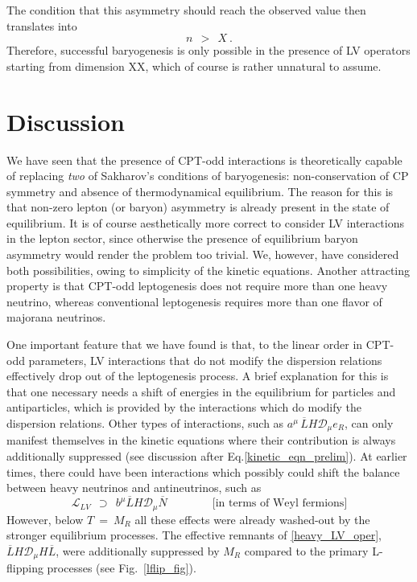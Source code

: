 \documentclass[12pt]{revtex4}
\newcommand{\md}{\mathcal{D}}
\newcommand{\ov}{\overline}
\begin{document}
	The condition that this asymmetry should reach the observed value then translates
	into
\[
	n~~>~~X~.
\]
	Therefore, successful baryogenesis is only possible in the presence of LV operators
	starting from dimension XX, which of course is rather 
	unnatural to assume.


%
%
\section{Discussion}

	We have seen that the presence of CPT-odd interactions is theoretically capable
	of replacing \emph{two} of Sakharov's conditions of baryogenesis: non-conservation 
	of CP symmetry and absence of thermodynamical equilibrium. 
	The reason for this is that non-zero lepton (or baryon) asymmetry is already present 
	in the state of equilibrium.
	It is of course aesthetically more correct to consider LV interactions in the 
	lepton sector,
	since otherwise the presence of equilibrium baryon asymmetry would render the 
	problem too trivial.
	We, however, have considered both possibilities, owing to  simplicity of the kinetic
	equations.
	Another attracting property is that CPT-odd leptogenesis does not require more than
	one heavy neutrino, whereas conventional leptogenesis requires more than one flavor
	of majorana neutrinos.

	One important feature that we have found is that, to the linear order in CPT-odd 
	parameters, LV interactions that do not modify the dispersion relations effectively 
	drop out of the leptogenesis process.
	A brief explanation for this is that one necessary needs a shift of energies
	in the equilibrium for particles and antiparticles, which is provided by the 
	interactions which do modify the dispersion relations. 
	Other types of interactions, such as $ a^\mu\, \ov{L}H \md_\mu e_R $,
	can only manifest themselves in the kinetic equations where their contribution
	is always additionally suppressed 
	(see discussion after Eq.\eqref{kinetic_eqn_prelim}).
	At earlier times, there could have been interactions which possibly could 
	shift the balance between heavy neutrinos and antineutrinos, such as 
\begin{equation}
\label{heavy_LV_oper}
	\mathcal{L}_{LV} ~~\supset~~
	 b^\mu \ov{L} H \md_\mu \ov{N} \qquad\qquad \text{[in terms of Weyl fermions]}
\end{equation}
	However, below $ T ~=~ M_R $ all these effects
	were already washed-out by the stronger equilibrium processes.
	The effective remnants of \eqref{heavy_LV_oper}, $ \ov{L}H \md_\mu H \ov{L} $, 
	were additionally suppressed by $ M_R $ compared to the primary L-flipping processes
	(see Fig.~\ref{lflip_fig}).
	
\end{document}
